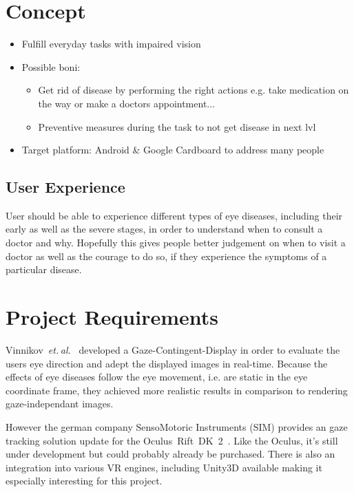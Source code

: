 \documentclass{acm_proc_article-sp}
\newcommand{\etal}{\textit{et. al.}}
\begin{document}
\section{Concept}

\begin{itemize}
  \item Fulfill everyday tasks with impaired vision
  \item Possible boni: 
  \begin{itemize}
    \item Get rid of disease by performing the right actions
    e.g. take medication on the way or make a doctors appointment...
    \item Preventive measures during the task to not get disease in next lvl
  \end{itemize}
  \item Target platform: Android \& Google Cardboard to address many people
\end{itemize}

\subsection{User Experience}

User should be able to experience different types of eye diseases, including
their early as well as the severe stages, in order to understand when to consult
a doctor and why. Hopefully this gives people better judgement on when to visit
a doctor as well as the courage to do so, if they experience the symptoms of
a particular disease.

\section{Project Requirements}
Vinnikov \etal \cite{gazedisplays} developed a Gaze-Contingent-Display in order
to evaluate the users eye direction and adept the displayed images in real-time.
Because the effects of eye diseases follow the eye movement, i.e. are static in
the eye coordinate frame, they achieved more realistic results in comparison to
rendering gaze-independant images.

However the german company SensoMotoric Instruments (SIM) provides an gaze
tracking solution update for the Oculus Rift DK 2 \cite{smi-oculus, arstechoculus}.
Like the Oculus, it's
still under development but could probably already be purchased. There is also
an integration into various VR engines, including Unity3D available making it
especially interesting for this project.
\end{document}
